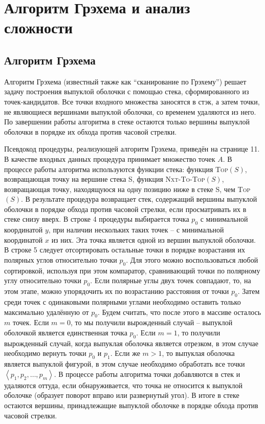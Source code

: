 \section{Алгоритм Грэхема и анализ сложности}

\subsection{Алгоритм Грэхема}

Алгоритм Грэхема (известный также как \textquotedblleft{}сканирование по Грэхему\textquotedblright{})\footnotemark{} решает задачу построения выпуклой оболочки с помощью стека, сформированного из точек-кандидатов. Все точки входного множества заносятся в стэк, а затем точки, не являющиеся вершинами выпуклой оболочки, со временем удаляются из него. По завершении работы алгоритма в стеке остаются только вершины выпуклой оболочки в порядке их обхода против часовой стрелки.


Псевдокод процедуры, реализующей алгоритм Грэхема, приведён на странице 11. В качестве входных данных процедура принимает множество точек $A$. В процессе работы алгоритма используются функции стека: функция \textsc{Top}$(S)$, возвращающая точку на вершине стека S, функция \textsc{Nxt-To-Top}$(S)$, возвращающая точку, находящуюся на одну позицию ниже в стеке S, чем \textsc{Top}$(S)$. В результате процедура возвращает стек, содержащий вершины выпуклой оболочки в порядке обхода против часовой стрелки, если просматривать их в стеке снизу вверх.
В строке 4 процедуры выбирается точка $p_0$ с минимальной координатой $y$, при наличии нескольких таких точек -- с минимальной координатой $x$ из них. Эта точка является одной из вершин выпуклой оболочки. В строке 5 следует отсортировать остальные точки в порядке возрастания их полярных углов относительно точки $p_0$. Для этого можно воспользоваться любой сортировкой, используя при этом компаратор, сравнивающий точки по полярному углу относительно точки $p_0$. Если полярные углы двух точек совпадают, то, на этом этапе, можно упорядочить их по возрастанию расстояния от точки $p_0$. Затем среди точек с одинаковыми полярными углами необходимо оставить только максимально удалённую от $p_0$. Будем считать, что после этого в массиве осталось $m$ точек. Если $m = 0$, то мы получили вырожденный случай -- выпуклой оболочкой является единственная точка $p_0$. Если $m = 1$, то получили вырожденный случай, когда выпуклая оболочка является отрезком, в этом случае необходимо вернуть точки $p_0$ и $p_1$. Если же $m > 1$, то выпуклая оболочка является выпуклой фигурой, в этом случае необходимо обработать все точки $\left\langle p_1, p_2, \dots, p_m\right\rangle $. В процессе работы алгоритма точки добавляются в стек и удаляются оттуда, если обнаруживается, что точка не относится к выпуклой оболочке (образует поворот вправо или развернутый угол). В итоге в стеке остаются вершины, принадлежащие выпуклой оболочке в порядке обхода против часовой стрелки.

